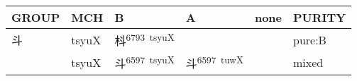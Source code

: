\documentclass[14pt,a4paper]{scrartcl}
\begin{document}
\begin{longtable}[c]{@{}llllll@{}}
\toprule
\begin{minipage}[b]{0.14\columnwidth}\raggedright\strut
GROUP
\strut\end{minipage} &
\begin{minipage}[b]{0.14\columnwidth}\raggedright\strut
MCH
\strut\end{minipage} &
\begin{minipage}[b]{0.14\columnwidth}\raggedright\strut
B
\strut\end{minipage} &
\begin{minipage}[b]{0.14\columnwidth}\raggedright\strut
A
\strut\end{minipage} &
\begin{minipage}[b]{0.14\columnwidth}\raggedright\strut
none
\strut\end{minipage} &
\begin{minipage}[b]{0.14\columnwidth}\raggedright\strut
PURITY
\strut\end{minipage}\tabularnewline
\midrule
\endhead
\begin{minipage}[t]{0.14\columnwidth}\raggedright\strut
斗
\strut\end{minipage} &
\begin{minipage}[t]{0.14\columnwidth}\raggedright\strut
tsyuX
\strut\end{minipage} &
\begin{minipage}[t]{0.14\columnwidth}\raggedright\strut
枓\textsuperscript{6793~tsyuX}
\strut\end{minipage} &
\begin{minipage}[t]{0.14\columnwidth}\raggedright\strut
\strut\end{minipage} &
\begin{minipage}[t]{0.14\columnwidth}\raggedright\strut
\strut\end{minipage} &
\begin{minipage}[t]{0.14\columnwidth}\raggedright\strut
pure:B
\strut\end{minipage}\tabularnewline
\begin{minipage}[t]{0.14\columnwidth}\raggedright\strut
𣁬
\strut\end{minipage} &
\begin{minipage}[t]{0.14\columnwidth}\raggedright\strut
tsyuX
\strut\end{minipage} &
\begin{minipage}[t]{0.14\columnwidth}\raggedright\strut
斗\textsuperscript{6597~tsyuX}
\strut\end{minipage} &
\begin{minipage}[t]{0.14\columnwidth}\raggedright\strut
斗\textsuperscript{6597~tuwX}
\strut\end{minipage} &
\begin{minipage}[t]{0.14\columnwidth}\raggedright\strut
\strut\end{minipage} &
\begin{minipage}[t]{0.14\columnwidth}\raggedright\strut
mixed
\strut\end{minipage}\tabularnewline
\bottomrule
\end{longtable}
\end{document}
